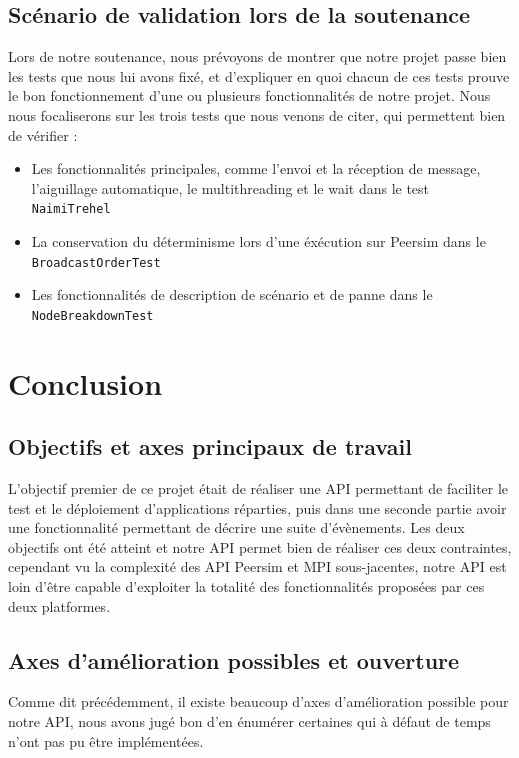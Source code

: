 \documentclass{article}
\begin{document}
		\subsection{Scénario de validation lors de la soutenance}
Lors de notre soutenance, nous prévoyons de montrer que notre projet passe bien les tests que nous lui avons fixé, et d'expliquer en quoi chacun de ces tests prouve le bon fonctionnement d'une ou plusieurs fonctionnalités de notre projet. Nous nous focaliserons sur les trois tests que nous venons de citer, qui permettent bien de vérifier : 
\begin{itemize}
\item Les fonctionnalités principales, comme l'envoi et la réception de message, l'aiguillage automatique, le multithreading et le wait dans le test \verb|NaimiTrehel| 
\item La conservation du déterminisme lors d'une éxécution sur Peersim dans le \verb|BroadcastOrderTest| 
\item Les fonctionnalités de description de scénario et de panne dans le \verb|NodeBreakdownTest| 
\end{itemize} 
		\newpage
		\section{Conclusion}
			\subsection{Objectifs et axes principaux de travail}
			L'objectif premier de ce projet était de réaliser une API permettant de faciliter le test et le déploiement d'applications réparties, puis dans une seconde partie avoir une 
			fonctionnalité permettant de décrire une suite d'évènements. 
			\newline
			Les deux objectifs ont été atteint et notre API permet bien de réaliser ces deux contraintes,
			cependant vu la complexité des API Peersim et MPI sous-jacentes, notre API est loin d'être capable d'exploiter la totalité des fonctionnalités proposées par ces deux platformes.
			\subsection{Axes d'amélioration possibles et ouverture}
			Comme dit précédemment, il existe beaucoup d'axes d'amélioration possible pour notre API, nous avons jugé bon d'en énumérer certaines qui à défaut de temps n'ont pas pu être implémentées.
\end{document}
